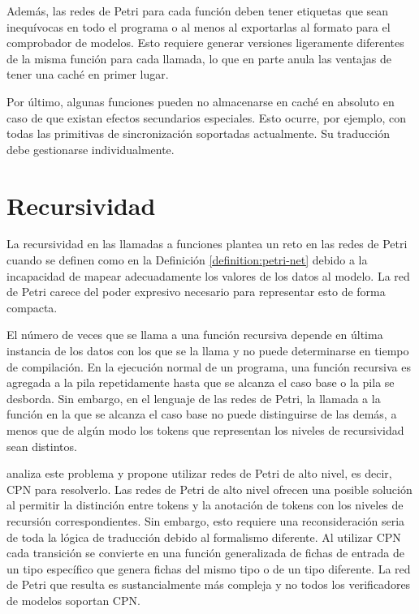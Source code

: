 Además, las redes de Petri para cada función deben tener etiquetas que sean inequívocas en
todo el programa o al menos al exportarlas al formato para el comprobador de modelos. Esto
requiere generar versiones ligeramente diferentes de la misma función para cada llamada, lo
que en parte anula las ventajas de tener una caché en primer lugar.

Por último, algunas funciones pueden no almacenarse en caché en absoluto en caso de que
existan efectos secundarios especiales. Esto ocurre, por ejemplo, con todas las primitivas de
sincronización soportadas actualmente. Su traducción debe gestionarse individualmente.

\section{Recursividad}
\label{sec:future-work-recursion}

La recursividad en las llamadas a funciones plantea un reto en las redes de Petri cuando se definen como
en la Definición \ref{definition:petri-net} debido a la incapacidad de mapear adecuadamente los valores de los datos al
modelo. La red de Petri carece del poder expresivo necesario para representar esto de forma compacta.

El número de veces que se llama a una función recursiva depende en última instancia de los
datos con los que se la llama y no puede determinarse en tiempo de compilación. En la ejecución
normal de un programa, una función recursiva es agregada a la pila
repetidamente hasta que se alcanza el caso base o la pila se desborda.
Sin embargo, en el lenguaje de las redes de Petri, la
llamada a la función en la que se alcanza el caso base no puede distinguirse de las demás, a
menos que de algún modo los tokens que representan los niveles de recursividad sean distintos.

\cite[Sec. 3.4.2]{meyer2020} analiza este problema
y propone utilizar redes de Petri de alto nivel,
es decir, \acrfull{CPN} para resolverlo.
Las redes de Petri de alto nivel ofrecen una posible solución al permitir la distinción
entre tokens y la anotación de tokens con los niveles de recursión correspondientes.
Sin embargo, esto requiere una reconsideración seria de toda la lógica de traducción
debido al formalismo diferente.
Al utilizar \acrshort{CPN} cada transición se convierte en una función
generalizada de fichas de entrada de un tipo específico que genera fichas del mismo tipo o de
un tipo diferente. La red de Petri que resulta es sustancialmente más compleja y no todos los
verificadores de modelos soportan \acrshort{CPN}.

